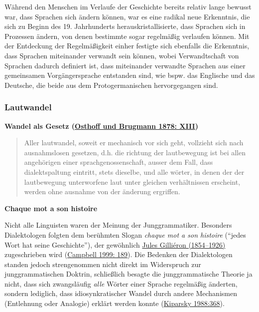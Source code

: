 Während den Menschen im Verlaufe der Geschichte bereits relativ lange
bewusst war, dass Sprachen sich ändern können, war es eine radikal neue
Erkenntnis, die sich zu Beginn des 19. Jahrhunderts
herauskristallisierte, dass Sprachen sich in Prozessen ändern, von denen
bestimmte sogar regelmäßig verlaufen können. Mit der Entdeckung der
Regelmäßigkeit einher festigte sich ebenfalls die Erkenntnis, dass
Sprachen miteinander verwandt sein können, wobei Verwandtschaft von
Sprachen dadurch definiert ist, dass miteinander verwandte Sprachen aus
einer gemeinsamen Vorgängersprache entstanden sind, wie bspw. das
Englische und das Deutsche, die beide aus dem Protogermanischen
hervorgegangen sind.


\subsubsection{\texorpdfstring{{Lautwandel}}{Lautwandel}}

\vspace{0.5cm}\par\noindent\textbf{Wandel als Gesetz\vspace{0.5cm}
(\href{http://bibliography.lingpy.org?key=Osthoff1878}{Osthoff und
Brugmann 1878: XIII})}

\begin{quote}
Aller lautwandel, soweit er mechanisch vor sich geht, vollzieht sich
nach ausnahmslosen gesetzen, d.h. die richtung der lautbewegung ist bei
allen angehörigen einer sprachgenossenschaft, ausser dem Fall, dass
dialektspaltung eintritt, stets dieselbe, und alle wörter, in denen der
der lautbewegung unterworfene laut unter gleichen verhältnissen
erscheint, werden ohne ausnahme von der änderung ergriffen.
\end{quote}



\vspace{0.5cm}\par\noindent\textbf{Chaque mot a son histoire}\vspace{0.5cm}

Nicht alle Linguisten waren der Meinung der Junggrammatiker. Besonders
Dialektologen folgten dem berühmten Slogan \emph{chaque mot a son
histoire} (``jedes Wort hat seine Geschichte''), der gewöhnlich
\href{http://de.wikipedia.org/wiki/Jules_Gilliéron}{Jules Gilliéron
(1854--1926)} zugeschrieben wird
(\href{http://bibliography.lingpy.org?key=Campbell1999}{Campbell 1999:
189}). Die Bedenken der Dialektologen standen jedoch strengenommen nicht
direkt im Widerspruch zur junggrammatischen Doktrin, schließlich besagte
die junggrammatische Theorie ja nicht, dass sich zwangsläufig
\emph{alle} Wörter einer Sprache regelmäßig änderten, sondern lediglich,
dass idiosynkratischer Wandel durch andere Mechanismen (Entlehnung oder
Analogie) erklärt werden konnte
(\href{http://bibliography.lingpy.org?key=Kiparsky1988}{Kiparsky
1988:368}).

